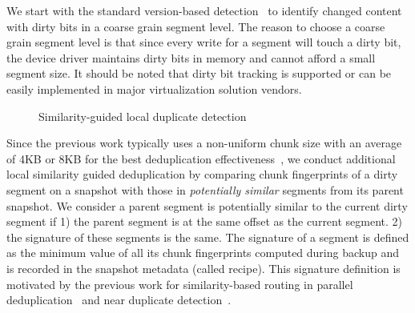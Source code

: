 \begin{itemize}

We start with the standard version-based detection~\cite{Clements2009,Vrable2009}
to identify changed content with dirty bits in a coarse grain segment level.
The reason to choose a coarse grain segment level is that 
since every write for a segment will touch a dirty bit, the device driver maintains dirty bits in 
memory and cannot afford a small segment size.
It should be noted that dirty bit tracking is supported or can be easily implemented in 
major virtualization solution vendors. 

\begin{figure}[htbp]
  \centering
  \caption{Similarity-guided local duplicate detection}
  \label{fig:local_dedup}
\end{figure}

Since the previous work typically uses a non-uniform chunk size 
with an average of 4KB or 8KB for the best deduplication 
effectiveness~\cite{Guo2011,extreme_binning09,bottleneck08,Dong2011},
we conduct additional local similarity guided deduplication 
by comparing chunk fingerprints of a dirty segment on a snapshot 
with those in  {\em potentially similar} segments from its parent snapshot. 
We consider a parent  segment is  potentially similar to the current dirty segment if 1) the parent segment
is at the same offset as the current segment.
2) the signature of these segments is the same.
The signature of a segment is defined as the minimum value of all its chunk fingerprints 
computed during backup and is recorded in the snapshot metadata (called recipe). 
This signature definition is motivated by the previous work for similarity-based routing in parallel
deduplication~\cite{extreme_binning09,Dong2011} and near duplicate detection~\cite{shingling97}. 




\end{itemize}
